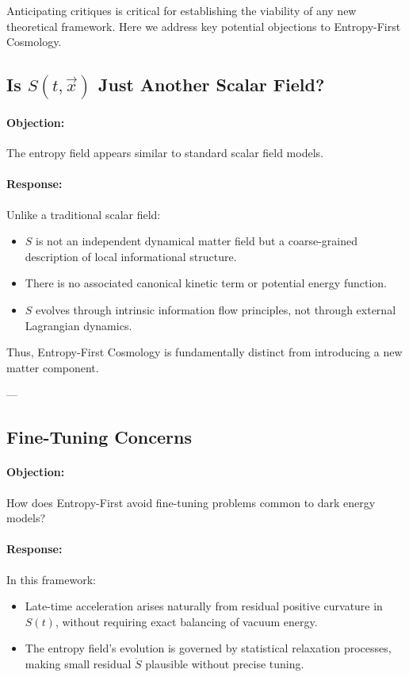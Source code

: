 \documentclass{article}
\begin{document}
Anticipating critiques is critical for establishing the viability of any new theoretical framework.
Here we address key potential objections to Entropy-First Cosmology.

\subsection{Is $S(t, \vec{x})$ Just Another Scalar Field?}

\paragraph{Objection:}  
The entropy field appears similar to standard scalar field models.

\paragraph{Response:}
Unlike a traditional scalar field:
\begin{itemize}
    \item $S$ is not an independent dynamical matter field but a coarse-grained description of local informational structure.
    \item There is no associated canonical kinetic term or potential energy function.
    \item $S$ evolves through intrinsic information flow principles, not through external Lagrangian dynamics.
\end{itemize}

Thus, Entropy-First Cosmology is fundamentally distinct from introducing a new matter component.

---

\subsection{Fine-Tuning Concerns}

\paragraph{Objection:}  
How does Entropy-First avoid fine-tuning problems common to dark energy models?

\paragraph{Response:}
In this framework:
\begin{itemize}
    \item Late-time acceleration arises naturally from residual positive curvature in $S(t)$, without requiring exact balancing of vacuum energy.
    \item The entropy field’s evolution is governed by statistical relaxation processes, making small residual $\ddot{S}$ plausible without precise tuning.
\end{itemize}
\end{document}
